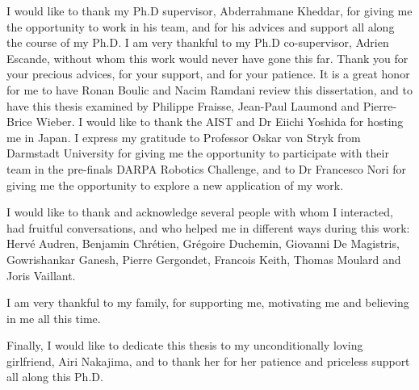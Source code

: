 
\begin{acknowledgements}

I would like to thank my Ph.D supervisor, Abderrahmane Kheddar, for giving me the opportunity to work in his team, and for his advices and support all along the course of my Ph.D.
I am very thankful to my Ph.D co-supervisor, Adrien Escande, without whom this work would never have gone this far.
Thank you for your precious advices, for your support, and for your patience.
It is a great honor for me to have Ronan Boulic and Nacim Ramdani review this dissertation, and to have this thesis examined by Philippe Fraisse, Jean-Paul Laumond and Pierre-Brice Wieber.
I would like to thank the AIST and Dr Eiichi Yoshida for hosting me in Japan.
I express my gratitude to Professor Oskar von Stryk from Darmstadt University for giving me the opportunity to participate with their team in the pre-finals DARPA Robotics Challenge, and to Dr Francesco Nori for giving me the opportunity to explore a new application of my work.

I would like to thank and acknowledge several people with whom I interacted, had fruitful conversations, and who helped me in different ways during this work:
Herv\'e Audren,
Benjamin Chr\'etien,
Gr\'egoire Duchemin,
Giovanni De Magistris,
Gowrishankar Ganesh,
Pierre Gergondet,
Francois Keith,
Thomas Moulard and
Joris Vaillant.

I am very thankful to my family, for supporting me, motivating me and believing in me all this time.

Finally, I would like to dedicate this thesis to my unconditionally loving girlfriend, Airi Nakajima, and to thank her for her patience and priceless support all along this Ph.D.

\end{acknowledgements}
